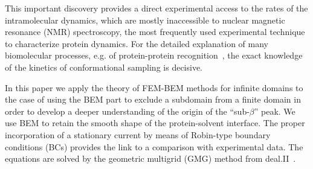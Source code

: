 \documentclass[runningheads]{lncse}
\newcommand{\mydiff}[2]{{}{#2}}
\begin{document}
%
This important discovery provides a direct experimental access to the rates of the intramolecular dynamics, 
%
which are 
 \mydiff{inaccessible}{mostly inaccessible} to nuclear magnetic resonance (NMR) spectroscopy, 
 the most frequently used experimental technique 
 to characterize protein dynamics.
%
%
For the detailed explanation of many biomolecular processes, e.g. of protein-protein recognition~\cite{kleanthous2000protein}, %
the exact knowledge of the kinetics of conformational sampling is decisive.
%
\mydiff{A final theoretical explanation of the ``sub-$\beta$'' peak has not been given, yet.}{}

In this paper we \mydiff{address some of the difficulties of modeling DRS by FEM}{apply the theory of FEM-BEM methods for infinite domains to the case of using the BEM part to exclude a subdomain from a finite domain} in order to develop a deeper understanding of the origin of the ``sub-$\beta$'' peak.
%
We use BEM 
to retain the smooth
shape of\mydiff{, and the changes in dielectric properties at,}{} the protein-solvent interface.
%
The proper incorporation of a stationary current by means of Robin-type boundary conditions (BCs) 
provides
the link to a comparison with \mydiff{experiment}{experimental data}.
%
%
%
The equations are solved by the geometric multigrid (GMG) method \cite{JanssenKanschat2011SIAM} from deal.II~\cite{dealii2007}.
\end{document}
